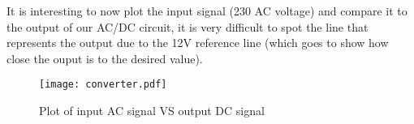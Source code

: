 It is interesting to now plot the input signal (230 AC voltage) and compare it to the output of our AC/DC circuit, it is very difficult to spot the line that represents the output due to the 12V reference line (which goes to show how close the ouput is to the desired value). 

\begin{figure}[h]
	\centering
	\texttt{[image: converter.pdf]}
	\caption{Plot of input AC signal VS output DC signal}
	\label{fig:sim_converter}
\end{figure}
\pagebreak


